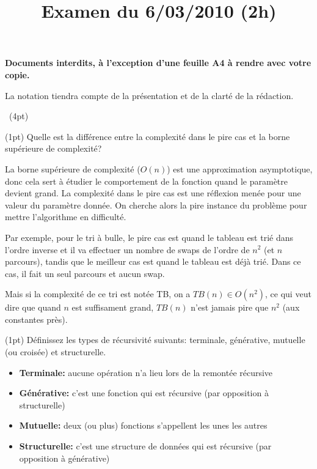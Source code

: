 \documentclass[10pt]{article}\usepackage[nu]{esial}
\begin{document}
\title{Examen du 6/03/2010 (2h)}
\maketitle

\begin{centering}
  \textbf{\large Documents interdits, à l'exception d'une feuille A4 à rendre
    avec votre copie.}

\end{centering}
\centerline{La notation tiendra compte de la présentation et de la clarté de
  la rédaction.}
\bigskip



\bigskip\QuestionCours~(4pt)

\Question(1pt) Quelle est la différence entre la complexité dans le pire
cas et la borne supérieure de complexité?

\begin{Reponse}
  La borne supérieure de complexité ($O(n)$) est une approximation
  asymptotique, donc cela sert à étudier le comportement de la fonction quand
  le paramètre devient grand. La complexité dans le pire cas est une réflexion
  menée pour une valeur du paramètre donnée. On cherche alors la pire instance
  du problème pour mettre l'algorithme en difficulté. 

  Par exemple, pour le tri à bulle, le pire cas est quand le tableau est trié
  dans l'ordre inverse et il va effectuer un nombre de swaps de l'ordre de
  $n^2$ (et $n$ parcours), tandis que le meilleur cas est quand le tableau est
  déjà trié. Dans ce cas, il fait un seul parcours et aucun swap. 

  Mais si la complexité de ce tri est notée TB, on a $TB(n)\in O(n^2)$, ce qui
  veut dire que quand $n$ est suffisament grand, $TB(n)$ n'est jamais pire que
  $n^2$ (aux constantes près).
\end{Reponse}

\Question(1pt) Définissez les types de récursivité suivants: terminale,
générative, mutuelle (ou croisée) et structurelle.

\begin{Reponse}
  \begin{itemize}
  \item \textbf{Terminale:} aucune opération n'a lieu lors de la remontée
    récursive
  \item \textbf{Générative:} c'est une fonction qui est récursive (par
    opposition à structurelle)
  \item \textbf{Mutuelle:} deux (ou plus) fonctions s'appellent les unes les
    autres
  \item \textbf{Structurelle:} c'est une structure de données qui est récursive
    (par opposition à générative)
  \end{itemize}
\end{Reponse}
\end{document}
